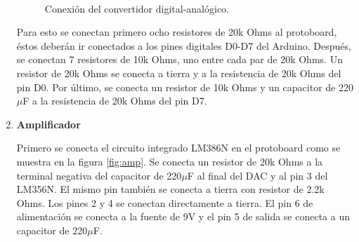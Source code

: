 \documentclass[11pt]{article}
\begin{document}
\begin{enumerate}[label=\textbf{Paso \arabic*:}]
\begin{figure}[H]
\centering
{} \\
\caption{Conexión del convertidor digital-analógico.}
\label{fig:dac}
\end{figure}

Para esto se conectan primero ocho resistores de 20k Ohms al protoboard, éstos deberán ir conectados a los pines digitales D0-D7 del Arduino. Después, se conectan 7 resistores de 10k Ohms, uno entre cada par de 20k Ohms. Un resistor de 20k Ohms se conecta a tierra y a la resistencia de 20k Ohms del pin D0. Por último, se conecta un resistor de 10k Ohms y un capacitor de 220$\mu$F a la resistencia de 20k Ohms del pin D7.


\item \textbf{Amplificador}

Primero se conecta el circuito integrado LM386N en el protoboard como se muestra en la figura \ref{fig:amp}. Se conecta un resistor de 20k Ohms a la terminal negativa del capacitor de 220$\mu$F al final del DAC y al pin 3 del LM356N.  El mismo pin también se conecta a tierra con resistor de 2.2k Ohms. Los pines 2 y 4 se conectan directamente a tierra. El pin 6 de alimentación se conecta a la fuente de 9V y el pin 5 de salida se conecta a un capacitor de 220$\mu$F.


\end{enumerate}
\end{document}
